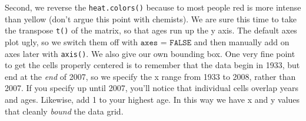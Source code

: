 \documentclass[a4paper]{article}
\begin{document}
Second, we reverse the \texttt{heat.colors()} because to most people red is more intense than yellow (don't argue this point with chemists). We are sure this time to take the transpose \texttt{t()} of the matrix, so that ages run up the y axis. The default axes plot ugly, so we switch them off with $\texttt{axes = FALSE}$ and then manually add on axes later with \texttt{axis()}. We also give our own bounding box. One very fine point to get the cells properly centered is to remember that the data begin in 1933, but end at the \textit{end} of 2007, so we specify the x range from 1933 to 2008, rather than 2007. If you specify up until 2007, you'll notice that individual cells overlap years and ages. Likewise, add 1 to your highest age. In this way we have x and y values that cleanly \textit{bound} the data grid.

\end{document}
